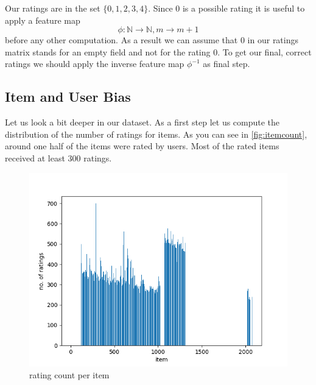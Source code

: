 \documentclass[DIV=14,twocolumn]{scrartcl}
\begin{document}
Our ratings are in the set $\{0,1,2,3,4\}$. Since 0 is a possible rating it is useful to apply a feature map $$\phi:\mathbb{N}\rightarrow\mathbb{N},m\rightarrow m+1$$ before any other computation. As a result we can assume that 0 in our ratings matrix stands for an empty field and not for the rating 0. To get our final, correct ratings we should apply the inverse feature map $\phi^{-1}$ as final step.

\subsection{Item and User Bias}\label{bias}
Let us look a bit deeper in our dataset. As a first step let us compute the distribution of the number of ratings for items. As you can see in \autoref{fig:itemcount}, around one half of the items were rated by users. Most of the rated items received at least 300 ratings. 
\begin{figure}[h]
	\includegraphics[width=\columnwidth]{../img/item-count}
	\caption{rating count per item}
	\label{fig:itemcount}
\end{figure}
\end{document}
